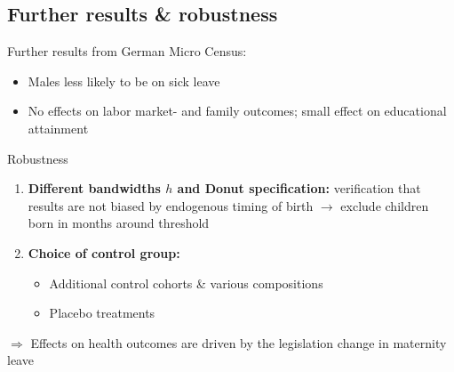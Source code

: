 \documentclass[usenames,dvipsnames]{beamer} %
\begin{document}
\subsection{Further results \& robustness}
\label{BACK_FROM_MZ}
\begin{frame}
\begin{block}{Further results from German Micro Census:}
\begin{itemize}
\item Males less likely to be on sick leave
\item No effects on labor market- and family outcomes; small effect on educational attainment
\end{itemize}
\end{block}
\hyperlink{MZ}{}
\pause


\begin{block}{Robustness}
\begin{enumerate}
\item \textbf{Different bandwidths $h$ and Donut specification:} verification that results are not biased by endogenous timing of birth $\rightarrow$ exclude children born in months around threshold
\item \textbf{Choice of control group:} 
\begin{itemize}
\item Additional control cohorts \& various compositions
\item Placebo treatments
\end{itemize}
\end{enumerate}

$\Rightarrow$ Effects on health outcomes are driven by the legislation change in maternity leave
\end{block}






\end{frame}




\end{document}
